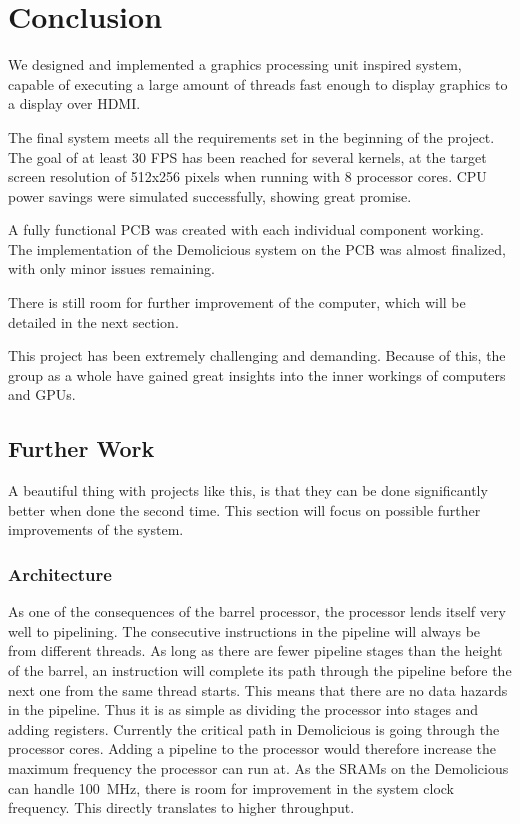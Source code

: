 \documentclass[../main/report.tex]{subfiles}
\begin{document}
\chapter{Conclusion}

We designed and implemented a graphics processing unit inspired system,
capable of executing a large amount of threads fast enough to display graphics to a display over HDMI.

The final system meets all the requirements set in the beginning of the project.
The goal of at least 30 FPS has been reached for several kernels,
at the target screen resolution of 512x256 pixels when running with 8 processor cores.
CPU power savings were simulated successfully, showing great promise.

A fully functional PCB was created with each individual component working.
The implementation of the Demolicious system on the PCB was almost finalized, with only minor issues remaining.

There is still room for further improvement of the computer, which will be detailed in the next section.

This project has been extremely challenging and demanding.
Because of this, the group as a whole have gained great insights into the inner workings of computers and GPUs.

\section{Further Work}

A beautiful thing with projects like this, is that they can be done significantly better when done the second time.
This section will focus on possible further improvements of the system.

\subsection{Architecture}

As one of the consequences of the barrel processor, the processor lends itself very well to pipelining.
The consecutive instructions in the pipeline will always be from different threads.
As long as there are fewer pipeline stages than the height of the barrel, an instruction will complete its path through the pipeline before the next one from the same thread starts.
This means that there are no data hazards in the pipeline. Thus it is as simple as dividing the processor into stages and adding registers.
Currently the critical path in Demolicious is going through the processor cores.
Adding a pipeline to the processor would therefore increase the maximum frequency the processor can run at.
As the SRAMs on the Demolicious can handle \SI{100}{MHz}, there is room for improvement in the system clock frequency.
This directly translates to higher throughput.
\end{document}
